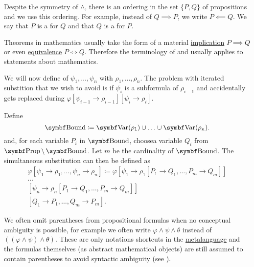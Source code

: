 \begin{definition}
\begin{definition}
   Despite the symmetry of \( \wedge \), there is an ordering in the set \( \{ P, Q \} \) of propositions and we use this ordering. For example, instead of \( Q \implies P \), we write \( P \impliedby Q \). We say that \( P \) is a  for \( Q \) and that \( Q \) is a  for \( P \).
\end{definition}

\begin{remark}\label{remark:statements_as_implications}
  Theorems in mathematics usually take the form of a material \hyperref[def:material_implication]{implication} \( P \implies Q \) or even \hyperref[def:equivalence]{equivalence} \( P \iff Q \). Therefore the terminology of  and  usually applies to statements about mathematics.
\end{remark}

  We will now define  of \( \psi_1, \ldots, \psi_n \) with \( \rho_1, \ldots, \rho_n \). The problem with iterated substition that we wish to avoid is if \( \psi_i \) is a subformula of \( \rho_{i-1} \) and accidentally gets replaced during \( \varphi[\psi_{i-1} \to \rho_{i-1}][\psi_i \to \rho_i] \).

  Define
  \begin{equation*}
    \Cat{Bound} \coloneqq \Bold{Var}(\rho_1) \cup \ldots \cup \Bold{Var}(\rho_n).
  \end{equation*}
  and, for each variable \( P_i \) in \( \Cat{Bound} \), choose\AOC a variable \( Q_i \) from \( \Bold{Prop} \setminus \Bold{Bound} \). Let \( m \) be the cardinality of \( \Bold{Bound} \). The simultaneous substitution can then be defined as
  \begin{align*}
    \varphi[\psi_1 \to \rho_1, \ldots, \psi_n \to \rho_n] \coloneqq \varphi
    [\psi_1 \to \rho_1[P_1 \to Q_1, \ldots, P_m \to Q_m]] \\
    \ldots \\
    [\psi_n \to \rho_n[P_1 \to Q_1, \ldots, P_m \to Q_m]] \\
    [Q_1 \to P_1, \ldots, Q_m \to P_m].
  \end{align*}
\end{definition}

\begin{remark}\label{remark:propositional_formula_parentheses}
  We often omit parentheses from propositional formulas when no conceptual ambiguity is possible, for example we often write \( \varphi \wedge \psi \wedge \theta \) instead of \( ((\varphi \wedge \psi) \wedge \theta) \). These are only notations shortcuts in the \hyperref[remark:metalanguage]{metalanguage} and the formulas themselves (as abstract mathematical objects) are still assumed to contain parentheses to avoid syntactic ambiguity (see ).
\end{remark}


